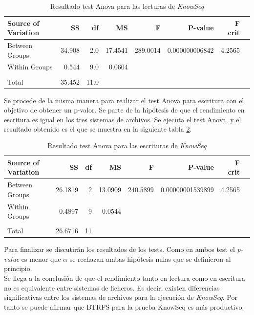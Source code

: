 \begin{table}[!htp]\centering

\scriptsize
\begin{tabular}{lrrrrrrr}\toprule
Source of Variation &SS &df &MS &F &P-value &F crit \\\midrule
Between Groups &34.908 &2.0 &17.4541 &289.0014 &0.000000006842 &4.2565 \\
Within Groups &0.544 &9.0 &0.0604 & & & \\
& & & & & & \\
Total &35.452 &11.0 & & & & \\
\bottomrule
\end{tabular}
\caption{Resultado test Anova para las lecturas de \textit{KnowSeq}}\label{tab:5.2}
\end{table}

Se procede de la misma manera para realizar el test Anova para escritura con el objetivo de obtener un p-valor. Se parte de la hipótesis de que el rendimiento en escritura es igual en los tres sistemas de archivos. Se ejecuta el test Anova, y el resultado obtenido es el que se muestra en la siguiente tabla \ref{tab:5.3}.

\begin{table}[!htp]\centering

\scriptsize
\begin{tabular}{lrrrrrrr}\toprule
Source of Variation &SS &df &MS &F &P-value &F crit \\\midrule
Between Groups &26.1819 &2 &13.0909 &240.5899 &0.00000001539899 &4.2565 \\
Within Groups &0.4897 &9 &0.0544 & & & \\
& & & & & & \\
Total &26.6716 &11 & & & & \\
\bottomrule
\end{tabular}
\caption{Resultado test Anova para las escrituras de \textit{KnowSeq}}\label{tab:5.3}
\end{table}

Para finalizar se discutirán los resultados de los tests. Como en ambos test el \textit{p-value} es menor que $\alpha$ se rechazan ambas hipótesis nulas que se definieron al principio.\\

Se llega a la conclusión de que el rendimiento tanto en lectura como en escritura no es equivalente entre sistemas de ficheros. Es decir, existen diferencias significativas entre los sistemas de archivos para la ejecución de \textit{KnowSeq}. Por tanto se puede afirmar que BTRFS para la prueba KnowSeq es más productivo.


